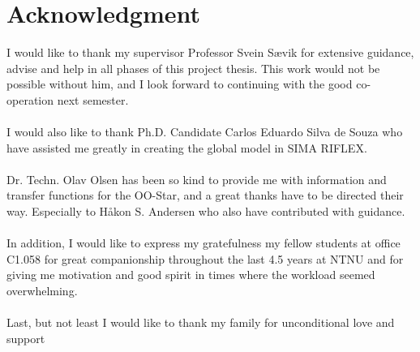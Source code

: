 \chapter*{Acknowledgment}
I would like to thank my supervisor Professor Svein Sævik for extensive guidance, advise and help in all phases of this project thesis. This work would not be possible without him, and I look forward to continuing with the good co-operation next semester. \\\\I would also like to thank Ph.D. Candidate Carlos Eduardo Silva de Souza who have assisted me greatly in creating the global model in SIMA RIFLEX. \\\\  Dr. Techn. Olav Olsen has been so kind to provide me with information and transfer functions for the OO-Star, and a great thanks have to be directed their way. Especially to Håkon S. Andersen who also have contributed with guidance. \\\\ In addition, I would like to express my gratefulness my fellow students at office C1.058 for great companionship throughout the last 4.5 years at NTNU and for giving me motivation and good spirit in times where the workload seemed overwhelming. \\\\ Last, but not least I would like to thank my family for unconditional love and support